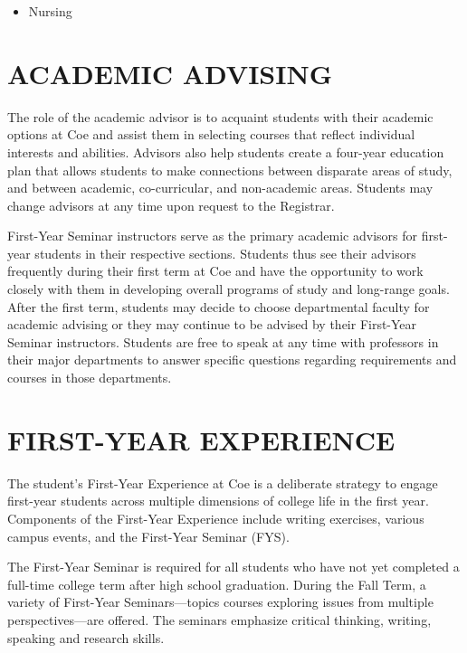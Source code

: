 \documentclass[
  letterpaper,
]{scrbook}
\providecommand{\tightlist}{%
  \setlength{\itemsep}{0pt}\setlength{\parskip}{0pt}}
\begin{document}
\begin{itemize}
\tightlist
\item
  Nursing
\end{itemize}

\hypertarget{academic-advising}{%
\chapter{ACADEMIC ADVISING}\label{academic-advising}}

The role of the academic advisor is to acquaint students with their
academic options at Coe and assist them in selecting courses that
reflect individual interests and abilities. Advisors also help students
create a four-year education plan that allows students to make
connections between disparate areas of study, and between academic,
co-curricular, and non-academic areas. Students may change advisors at
any time upon request to the Registrar.

First-Year Seminar instructors serve as the primary academic advisors
for first-year students in their respective sections. Students thus see
their advisors frequently during their first term at Coe and have the
opportunity to work closely with them in developing overall programs of
study and long-range goals. After the first term, students may decide to
choose departmental faculty for academic advising or they may continue
to be advised by their First-Year Seminar instructors. Students are free
to speak at any time with professors in their major departments to
answer specific questions regarding requirements and courses in those
departments.

\hypertarget{first-year-experience}{%
\chapter{FIRST-YEAR EXPERIENCE}\label{first-year-experience}}

The student's First-Year Experience at Coe is a deliberate strategy to
engage first-year students across multiple dimensions of college life in
the first year. Components of the First-Year Experience include writing
exercises, various campus events, and the First-Year Seminar (FYS).

The First-Year Seminar is required for all students who have not yet
completed a full-time college term after high school graduation. During
the Fall Term, a variety of First-Year Seminars---topics courses
exploring issues from multiple perspectives---are offered. The seminars
emphasize critical thinking, writing, speaking and research skills.
\end{document}
